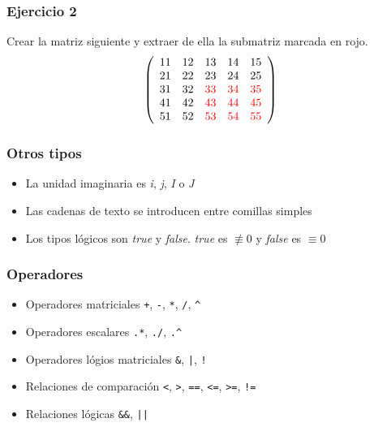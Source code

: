 \documentclass[12pt]{beamer}
\begin{document}
\begin{frame}
\frametitle{Ejercicio 2} 
Crear la matriz siguiente y extraer de ella la submatriz marcada en rojo.
\[ \left( \begin{array}{ccccc}
11&12&13&14&15\\
21&22&23&24&25\\
31&32&\textcolor{red}{33}&\textcolor{red}{34}&\textcolor{red}{35}\\
41&42&\textcolor{red}{43}&\textcolor{red}{44}&\textcolor{red}{45}\\
51&52&\textcolor{red}{53}&\textcolor{red}{54}&\textcolor{red}{55}
\end{array} \right) \]
\end{frame}

\begin{frame}
\frametitle{Otros tipos}
\begin{itemize}
\item La unidad imaginaria es \emph{i}, \emph{j}, \emph{I} o \emph{J}
\item Las cadenas de texto se introducen entre comillas simples
\item Los tipos lógicos son \emph{true} y \emph{false}.  \emph{true}
  es $\not \equiv 0$ y \emph{false} es $\equiv 0$
\end{itemize}
\end{frame}

\begin{frame}
\frametitle{Operadores}
\begin{itemize}
\item Operadores matriciales \texttt{+}, \texttt{-}, \texttt{*},
  \texttt{/}, \texttt{\^}
\item Operadores escalares \texttt{.*}, \texttt{./}, \texttt{.\^}
\item Operadores lógios matriciales \texttt{\&}, \texttt{|}, \texttt{!}
\item Relaciones de comparación \texttt{<}, \texttt{>}, \texttt{==},
  \texttt{<=}, \texttt{>=}, \texttt{!=}
\item Relaciones lógicas \texttt{\&\&}, \texttt{||}
\end{itemize}
\end{frame}

\end{document}
